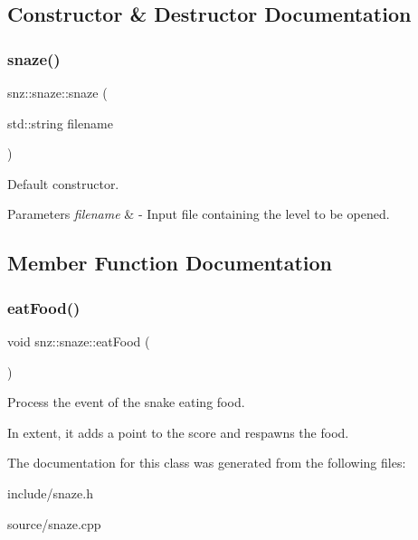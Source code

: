 \subsection{Constructor \& Destructor Documentation}
\mbox{\label{classsnz_1_1snaze_ad237720b60ff28c6947fcf0b99a18c77}} 
\subsubsection{\texorpdfstring{snaze()}{snaze()}}
{\footnotesize\ttfamily snz\+::snaze\+::snaze (\begin{DoxyParamCaption}\item[{std\+::string}]{filename }\end{DoxyParamCaption})}



Default constructor. 


\begin{DoxyParams}{Parameters}
{\em filename} & -\/ Input file containing the level to be opened. \\
\hline
\end{DoxyParams}


\subsection{Member Function Documentation}
\mbox{\label{classsnz_1_1snaze_ab1dc8fc6041a3f74824d43e11ae48e92}} 
\subsubsection{\texorpdfstring{eat\+Food()}{eatFood()}}
{\footnotesize\ttfamily void snz\+::snaze\+::eat\+Food (\begin{DoxyParamCaption}{ }\end{DoxyParamCaption})}



Process the event of the snake eating food. 

In extent, it adds a point to the score and respawns the food. 

The documentation for this class was generated from the following files\+:\begin{DoxyCompactItemize}
\item 
include/snaze.\+h\item 
source/snaze.\+cpp\end{DoxyCompactItemize}
